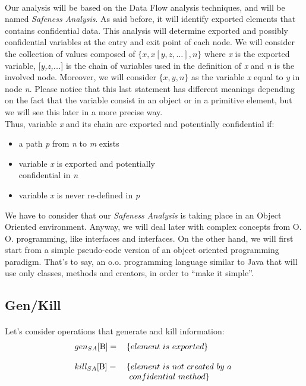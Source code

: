 \documentclass[letterpaper,twocolumn,10pt]{article}
\begin{document}
\paragraph{}
Our analysis will be based on the Data Flow analysis techniques, and will be named \emph{Safeness Analysis}. As said before, it will identify exported elements that contains confidential data. This analysis will determine exported and possibly confidential variables at the entry and exit point of each node. We will consider the collection of values composed of $\{x, x[y, z, \ldots], n\}$ where \emph{x} is the exported variable, [\emph{y,z,...}] is the chain of variables used in the definition of \emph{x} and \emph{n} is the involved node. Moreover, we will consider $\{x, y, n\}$ as the variable \emph{x} equal to \emph{y} in node \emph{n}. Please notice that this last statement has different meanings depending on the fact that the variable consist in an object or in a primitive element, but we will see this later in a more precise way.\\

Thus, variable \emph{x} and its chain are exported and potentially confidential if:
\begin{itemize}\itemsep2pt \parskip0pt 
\item a path \emph{p} from \emph{n} to \emph{m} exists
\item variable \emph{x} is exported and potentially\\ confidential in \emph{n}
\item variable \emph{x} is never re-defined in \emph{p}
\end{itemize}

We have to consider that our \emph{Safeness Analysis} is taking place in an Object Oriented environment. Anyway, we will deal later with complex concepts from O. O. programming, like interfaces and interfaces. On the other hand, we will first start from a simple pseudo-code version of an object oriented programming paradigm. That's to say, an o.o. programming language similar to Java that will use only classes, methods and creators, in order to ``make it simple''.

\subsection{Gen/Kill}
\paragraph{}
Let's consider operations that generate and kill information:
\begin{align*}
\begin{tabular}{  l l }
	$ gen_{SA}[\text{B}]= $ & $ \{ element\ is\ exported \} $\\ 
	& \\                  
	$  kill_{SA}[\text{B}]= $ & $ \{ element\ is\ not\ created\ by\ a\ $\\ 
	& $\ confidential\ method \} $ \\
\end{tabular}
\end{align*}
\end{document}
